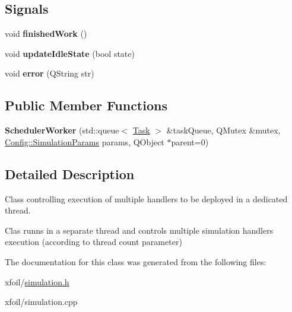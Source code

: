 \subsection*{Signals}
\begin{DoxyCompactItemize}
\item 
\mbox{\label{class_scheduler_worker_a2fd120b582cb00372117bbd5b1f2238d}} 
void {\bfseries finished\+Work} ()
\item 
\mbox{\label{class_scheduler_worker_a6258fd2861a3ce7798436f017b5de36a}} 
void {\bfseries update\+Idle\+State} (bool state)
\item 
\mbox{\label{class_scheduler_worker_a12e2df7be830c191c58afe3aead3b942}} 
void {\bfseries error} (Q\+String str)
\end{DoxyCompactItemize}
\subsection*{Public Member Functions}
\begin{DoxyCompactItemize}
\item 
\mbox{\label{class_scheduler_worker_abbce89dd767e79876256848966f38dda}} 
{\bfseries Scheduler\+Worker} (std\+::queue$<$ \hyperlink{struct_task}{Task} $>$ \&task\+Queue, Q\+Mutex \&mutex, \hyperlink{struct_config_1_1_simulation_params}{Config\+::\+Simulation\+Params} params, Q\+Object $\ast$parent=0)
\end{DoxyCompactItemize}


\subsection{Detailed Description}
Class controlling execution of multiple handlers to be deployed in a dedicated thread. 

Clas runns in a separate thread and controls multiple simulation handlers execution (according to thread count parameter) 

The documentation for this class was generated from the following files\+:\begin{DoxyCompactItemize}
\item 
xfoil/\hyperlink{simulation_8h}{simulation.\+h}\item 
xfoil/simulation.\+cpp\end{DoxyCompactItemize}
